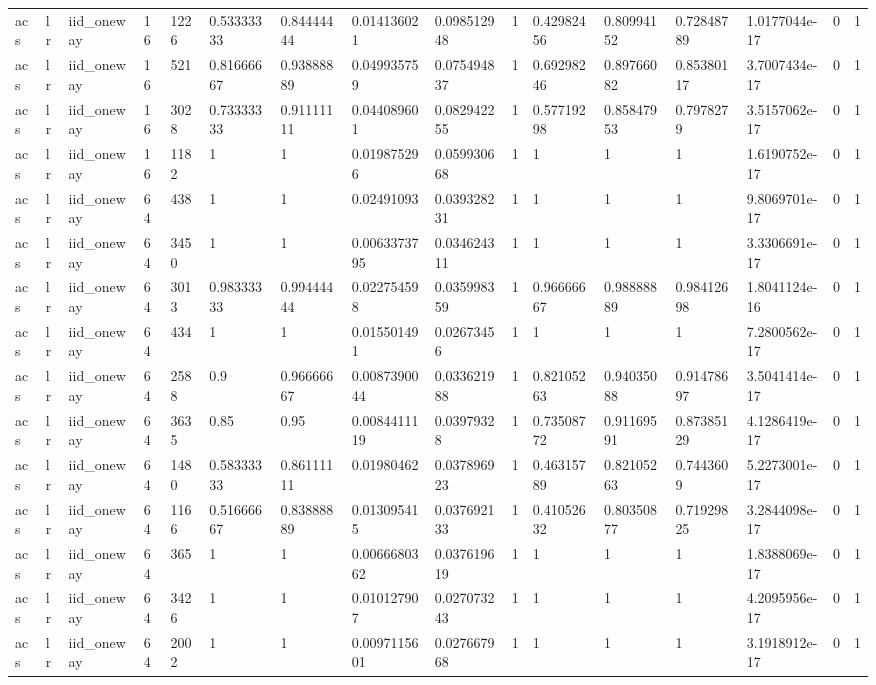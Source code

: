 \begin{tabular}{llllllllllllllll}
acs & lr & iid\_oneway & 16 & 1226 & 0.53333333 & 0.84444444 & 0.014136021 & 0.098512948 & 1 & 0.42982456 & 0.80994152 & 0.72848789 & 1.0177044e-17 & 0 & 1 \\
acs & lr & iid\_oneway & 16 & 521 & 0.81666667 & 0.93888889 & 0.049935759 & 0.075494837 & 1 & 0.69298246 & 0.89766082 & 0.85380117 & 3.7007434e-17 & 0 & 1 \\
acs & lr & iid\_oneway & 16 & 3028 & 0.73333333 & 0.91111111 & 0.044089601 & 0.082942255 & 1 & 0.57719298 & 0.85847953 & 0.7978279 & 3.5157062e-17 & 0 & 1 \\
acs & lr & iid\_oneway & 16 & 1182 & 1 & 1 & 0.019875296 & 0.059930668 & 1 & 1 & 1 & 1 & 1.6190752e-17 & 0 & 1 \\
acs & lr & iid\_oneway & 64 & 438 & 1 & 1 & 0.02491093 & 0.039328231 & 1 & 1 & 1 & 1 & 9.8069701e-17 & 0 & 1 \\
acs & lr & iid\_oneway & 64 & 3450 & 1 & 1 & 0.0063373795 & 0.034624311 & 1 & 1 & 1 & 1 & 3.3306691e-17 & 0 & 1 \\
acs & lr & iid\_oneway & 64 & 3013 & 0.98333333 & 0.99444444 & 0.022754598 & 0.035998359 & 1 & 0.96666667 & 0.98888889 & 0.98412698 & 1.8041124e-16 & 0 & 1 \\
acs & lr & iid\_oneway & 64 & 434 & 1 & 1 & 0.015501491 & 0.02673456 & 1 & 1 & 1 & 1 & 7.2800562e-17 & 0 & 1 \\
acs & lr & iid\_oneway & 64 & 2588 & 0.9 & 0.96666667 & 0.0087390044 & 0.033621988 & 1 & 0.82105263 & 0.94035088 & 0.91478697 & 3.5041414e-17 & 0 & 1 \\
acs & lr & iid\_oneway & 64 & 3635 & 0.85 & 0.95 & 0.0084411119 & 0.03979328 & 1 & 0.73508772 & 0.91169591 & 0.87385129 & 4.1286419e-17 & 0 & 1 \\
acs & lr & iid\_oneway & 64 & 1480 & 0.58333333 & 0.86111111 & 0.01980462 & 0.037896923 & 1 & 0.46315789 & 0.82105263 & 0.7443609 & 5.2273001e-17 & 0 & 1 \\
acs & lr & iid\_oneway & 64 & 1166 & 0.51666667 & 0.83888889 & 0.013095415 & 0.037692133 & 1 & 0.41052632 & 0.80350877 & 0.71929825 & 3.2844098e-17 & 0 & 1 \\
acs & lr & iid\_oneway & 64 & 365 & 1 & 1 & 0.0066680362 & 0.037619619 & 1 & 1 & 1 & 1 & 1.8388069e-17 & 0 & 1 \\
acs & lr & iid\_oneway & 64 & 3426 & 1 & 1 & 0.010127907 & 0.027073243 & 1 & 1 & 1 & 1 & 4.2095956e-17 & 0 & 1 \\
acs & lr & iid\_oneway & 64 & 2002 & 1 & 1 & 0.0097115601 & 0.027667968 & 1 & 1 & 1 & 1 & 3.1918912e-17 & 0 & 1 \\

\end{tabular}
